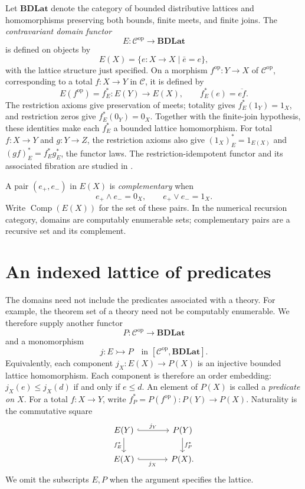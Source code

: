 \documentclass[11pt]{article}
\theoremstyle{definition}
\newcommand{\C}{\mathcal C}
\newcommand{\BDLat}{\mathbf{BDLat}}
\newcommand{\Comp}{\operatorname{Comp}}
\begin{document}
Let $\BDLat$ denote the category of bounded distributive lattices and
homomorphisms preserving both bounds, finite meets, and finite joins.
The \emph{contravariant domain functor}
\[
 E:\C^{\mathrm{op}}\longrightarrow\BDLat
\]
is defined on objects by
\[
 E(X)=\{e:X\to X\mid\bar e=e\},
\]
with the lattice structure just specified. On a morphism
$f^{\mathrm{op}}:Y\to X$ of $\C^{\mathrm{op}}$, corresponding to a
total $f:X\to Y$ in $\C$, it is defined by
\[
 E(f^{\mathrm{op}})=f_E^*:E(Y)\longrightarrow E(X),
 \qquad f_E^*(e)=\overline{ef}.
\]
The restriction axioms give preservation of meets;
totality gives $f_E^*(1_Y)=1_X$, and restriction zeros give
$f_E^*(0_Y)=0_X$. Together with the finite-join hypothesis, these
identities make each $f_E^*$ a bounded lattice homomorphism.
For total $f:X\to Y$ and $g:Y\to Z$, the restriction axioms also give
$(1_X)_E^*=1_{E(X)}$ and $(gf)_E^*=f_E^*g_E^*$, the functor laws.
The restriction-idempotent functor and its associated fibration are
studied in \cite[Sections~4.1--4.2]{RestrictionI}.

A pair $(e_+,e_-)$ in $E(X)$ is \emph{complementary} when
\[
 e_+\wedge e_-=0_X,\qquad e_+\vee e_-=1_X.
\]
Write $\Comp(E(X))$ for the set of these pairs. In the numerical
recursion category, domains are computably enumerable sets; complementary
pairs are a recursive set and its complement.

\section{An indexed lattice of predicates}

The domains need not include the predicates associated with a theory.
For example, the theorem set of a theory need not be computably enumerable.
We therefore supply another functor
\[
 P:\C^{\mathrm{op}}\longrightarrow\BDLat
\]
and a monomorphism
\[
 j:E\rightarrowtail P
 \quad\text{in }[\C^{\mathrm{op}},\BDLat].
\]
Equivalently, each component $j_X:E(X)\to P(X)$ is an injective
bounded lattice homomorphism. Each component is therefore an order
embedding: $j_X(e)\leq j_X(d)$ if and only if $e\leq d$.
An element of $P(X)$ is called a \emph{predicate on $X$}.
For a total $f:X\to Y$, write $f_P^*=P(f^{\mathrm{op}}):P(Y)\to P(X)$.
Naturality is the commutative square
\begin{equation}\label{eq:naturality}
\begin{tikzcd}[column sep=large]
 E(Y) \arrow[r,hook,"j_Y"] \arrow[d,"f_E^*"']
   & P(Y) \arrow[d,"f_P^*"] \\
 E(X) \arrow[r,hook,"j_X"'] & P(X).
\end{tikzcd}
\end{equation}
We omit the subscripts $E,P$ when the argument specifies the lattice.
\end{document}
